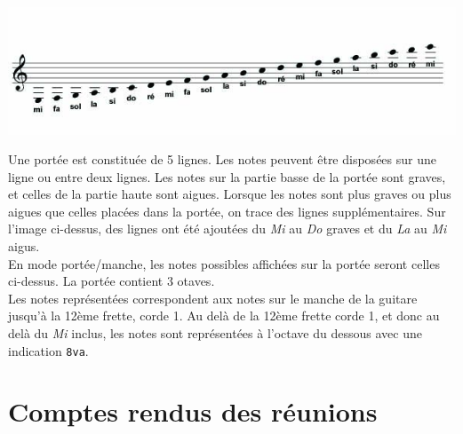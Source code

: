\documentclass{scrreprt}
\begin{document}
\bigbreak
\includegraphics[width=\textwidth]{images/note_portee.jpg}
\bigbreak

Une portée est constituée de 5 lignes. 
Les notes peuvent être disposées sur une ligne ou entre deux lignes. Les notes sur la partie basse de la portée sont graves, et celles de la partie haute sont aigues. 
Lorsque les notes sont plus graves ou plus aigues que celles placées dans la portée, on trace des lignes supplémentaires. Sur l'image ci-dessus, des lignes ont été ajoutées du \textit{Mi} au \textit{Do} graves et du \textit{La} au \textit{Mi} aigus.\\
En mode portée/manche, les notes possibles affichées sur la portée seront celles ci-dessus.
La portée contient 3 otaves. \\
Les notes représentées correspondent aux notes sur le manche de la guitare jusqu'à la 12ème frette, corde 1. 
Au delà de la 12ème frette corde 1, et donc au delà du \textit{Mi} inclus, les notes sont représentées à l'octave du dessous avec une indication \texttt{8va}.

\section{Comptes rendus des réunions}
\end{document}

